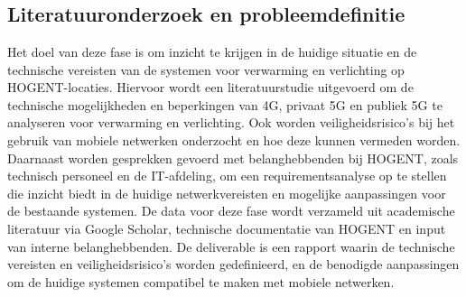 
\chapter{}%
\label{ch:methodologie}


\section{Literatuuronderzoek en probleemdefinitie}
Het doel van deze fase is om inzicht te krijgen in de huidige situatie en de technische vereisten van de systemen voor verwarming en verlichting op HOGENT-locaties. Hiervoor wordt een literatuurstudie uitgevoerd om de technische mogelijkheden en beperkingen van 4G, privaat 5G en publiek 5G te analyseren voor verwarming en verlichting. Ook worden veiligheidsrisico's bij het gebruik van mobiele netwerken onderzocht en hoe deze kunnen vermeden worden. Daarnaast worden gesprekken gevoerd met belanghebbenden bij HOGENT, zoals technisch personeel en de IT-afdeling, om een requirementsanalyse op te stellen die inzicht biedt in de huidige netwerkvereisten en mogelijke aanpassingen voor de bestaande systemen. De data voor deze fase wordt verzameld uit academische literatuur via Google Scholar, technische documentatie van HOGENT en input van interne belanghebbenden. De deliverable is een rapport waarin de technische vereisten en veiligheidsrisico’s worden gedefinieerd, en de benodigde aanpassingen om de huidige systemen compatibel te maken met mobiele netwerken.

